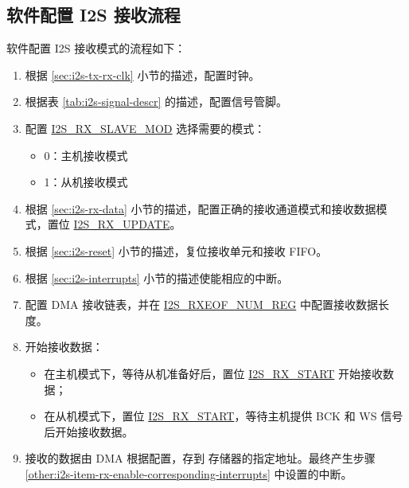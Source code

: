 \documentclass[main\_\_CN.tex]{subfiles}
\begin{document}
\subsection{软件配置 I2S 接收流程}\label{sec:i2s-configure-i2s-rx-mode}
软件配置 I2S 接收模式的流程如下：

\begin{enumerate}
    \item 根据 \ref{sec:i2s-tx-rx-clk} 小节的描述，配置时钟。

    \item 根据表 \ref{tab:i2s-signal-descr} 的描述，配置信号管脚。

    \item 配置 \hyperref[fielddesc:I2SRXSLAVEMOD]{I2S\_RX\_SLAVE\_MOD} 选择需要的模式：
    \begin{itemize}
        \item 0：主机接收模式
        \item 1：从机接收模式
    \end{itemize}
    
    \item 根据 \ref{sec:i2s-rx-data} 小节的描述，配置正确的接收通道模式和接收数据模式，置位 \hyperref[fielddesc:I2SRXUPDATE]{I2S\_RX\_UPDATE}。

    \item 根据 \ref{sec:i2s-reset} 小节的描述，复位接收单元和接收 FIFO。
    \item 根据 \ref{sec:i2s-interrupts} 小节的描述使能相应的中断。\label{other:i2s-item-rx-enable-corresponding-interrupts}
    
    \item 配置 DMA 接收链表，并在 \hyperref[regdesc:I2SRXEOFNUMREG]{I2S\_RXEOF\_NUM\_REG} 中配置接收数据长度。

    \item 开始接收数据：
    \begin{itemize}
        \item 在主机模式下，等待从机准备好后，置位 \hyperref[fielddesc:I2SRXSTART]{I2S\_RX\_START} 开始接收数据；
        \item 在从机模式下，置位 \hyperref[fielddesc:I2SRXSTART]{I2S\_RX\_START}，等待主机提供 BCK 和 WS 信号后开始接收数据。
    \end{itemize}
    \item 接收的数据由 DMA 根据配置，存到 \chipname{} 存储器的指定地址。最终产生步骤 \ref{other:i2s-item-rx-enable-corresponding-interrupts} 中设置的中断。
\end{enumerate}
\end{document}
